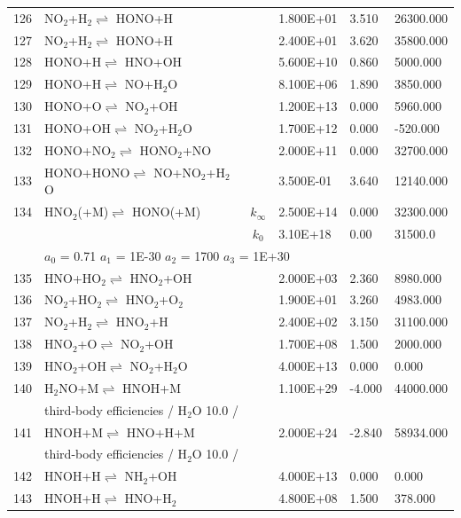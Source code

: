 \documentclass[11pt]{article}
\begin{document}
\begin{table}[hbt]
\begin{tabular}{|r l c l l l|}
126 &	NO$_{2}$+H$_{2}$$\rightleftharpoons$ HONO+H&	&	1.800E+01&	3.510&	26300.000\\ 
127 &	NO$_{2}$+H$_{2}$$\rightleftharpoons$ HONO+H&	&	2.400E+01&	3.620&	35800.000\\ 
128 &	HONO+H$\rightleftharpoons$ HNO+OH&	&	5.600E+10&	0.860&	5000.000\\ 
129 &	HONO+H$\rightleftharpoons$ NO+H$_{2}$O&	&	8.100E+06&	1.890&	3850.000\\ 
130 &	HONO+O$\rightleftharpoons$ NO$_{2}$+OH&	&	1.200E+13&	0.000&	5960.000\\ 
131 &	HONO+OH$\rightleftharpoons$ NO$_{2}$+H$_{2}$O&	&	1.700E+12&	0.000&	-520.000\\ 
132 &	HONO+NO$_{2}$$\rightleftharpoons$ HONO$_{2}$+NO&	&	2.000E+11&	0.000&	32700.000\\ 
133 &	HONO+HONO$\rightleftharpoons$ NO+NO$_{2}$+H$_{2}$O&	&	3.500E-01&	3.640&	12140.000\\ 
134 &	HNO$_{2}$(+M)$\rightleftharpoons$ HONO(+M)&	$k_{\infty}$&	2.500E+14&	0.000&	32300.000\\ 
	&	&	$k_0$&	3.10E+18& 0.00&	31500.0\\ 
	&\multicolumn{5}{l|}{	$a_0$ = 0.71	$a_1$ = 1E-30	$a_2$ = 1700	$a_3$ = 1E+30}\\ 
135 &	HNO+HO$_{2}$$\rightleftharpoons$ HNO$_{2}$+OH&	&	2.000E+03&	2.360&	8980.000\\ 
136 &	NO$_{2}$+HO$_{2}$$\rightleftharpoons$ HNO$_{2}$+O$_{2}$&	&	1.900E+01&	3.260&	4983.000\\ 
137 &	NO$_{2}$+H$_{2}$$\rightleftharpoons$ HNO$_{2}$+H&	&	2.400E+02&	3.150&	31100.000\\ 
138 &	HNO$_{2}$+O$\rightleftharpoons$ NO$_{2}$+OH&	&	1.700E+08&	1.500&	2000.000\\ 
139 &	HNO$_{2}$+OH$\rightleftharpoons$ NO$_{2}$+H$_{2}$O&	&	4.000E+13&	0.000&	0.000\\ 
140 &	H$_{2}$NO+M$\rightleftharpoons$ HNOH+M&	&	1.100E+29&	-4.000&	44000.000\\ 
	&\multicolumn{5}{l|}{third-body efficiencies  / H$_{2}$O 10.0 /}\\ 
141 &	HNOH+M$\rightleftharpoons$ HNO+H+M&	&	2.000E+24&	-2.840&	58934.000\\ 
	&\multicolumn{5}{l|}{third-body efficiencies  / H$_{2}$O 10.0 /}\\ 
142 &	HNOH+H$\rightleftharpoons$ NH$_{2}$+OH&	&	4.000E+13&	0.000&	0.000\\ 
143 &	HNOH+H$\rightleftharpoons$ HNO+H$_{2}$&	&	4.800E+08&	1.500&	378.000\\ 

\end{tabular}
\end{table}
\end{document}
